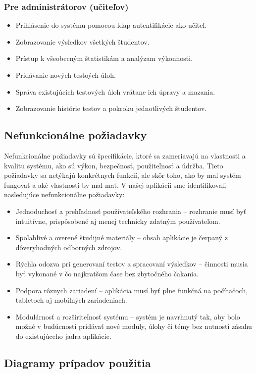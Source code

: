 \subsubsection{Pre administrátorov (učiteľov)}
\begin{itemize}
  \item Prihlásenie do systému pomocou \acrshort{ldap} autentifikácie ako učiteľ.
\item Zobrazovanie výsledkov všetkých študentov.
\item Prístup k všeobecným štatistikám a analýzam výkonnosti.
\item Pridávanie nových testoých úloh.
\item Správa existujúcich testových úloh vrátane ich úpravy a mazania.
\item Zobrazovanie histórie testov a pokroku jednotlivých študentov.
  \end{itemize}

\subsection{Nefunkcionálne požiadavky}
Nefunkcionálne požiadavky sú špecifikácie, ktoré sa zameriavajú na vlastnosti a kvalitu systému, ako sú výkon, bezpečnosť, použiteľnosť a údržba.
 Tieto požiadavky sa netýkajú konkrétnych funkcií, ale skôr toho, ako by mal systém fungovať a aké vlastnosti by mal mať. 
 V našej aplikácii sme identifikovali nasledujúce nefunkcionálne požiadavky:
 \begin{itemize} 
    \item Jednoduchosť a prehľadnosť používateľského rozhrania – rozhranie musí byť intuitívne, prispôsobené aj menej technicky zdatným používateľom. 
    \item Spoľahlivé a overené študijné materiály – obsah aplikácie je čerpaný z dôveryhodných odborných zdrojov.
    \item Rýchla odozva pri generovaní testov a spracovaní výsledkov – činnosti musia byť vykonané v čo najkratšom čase bez zbytočného čakania.
    \item Podpora rôznych zariadení – aplikácia musí byť plne funkčná na počítačoch, tabletoch aj mobilných zariadeniach. 
    \item Modulárnosť a rozšíriteľnosť systému – systém je navrhnutý tak, aby bolo možné v budúcnosti pridávať nové moduly, úlohy či témy bez nutnosti zásahu do existujúceho jadra aplikácie. 
  \end{itemize}


 \subsection{Diagramy prípadov použitia}
